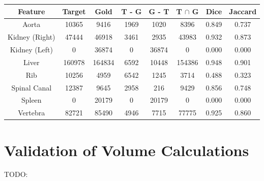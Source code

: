 \begin{center}
\begin{tabular}{cccccccc}
\scriptsize \textbf{Feature} & \scriptsize \textbf{Target} & \scriptsize \textbf{Gold} & \scriptsize \textbf{T - G} & \scriptsize \textbf{G - T} & \scriptsize \textbf{T $\cap$ G} & \scriptsize \textbf{Dice} & \scriptsize \textbf{Jaccard} \\
\hline
\scriptsize Aorta & \scriptsize 10365 & \scriptsize 9416 & \scriptsize 1969 & \scriptsize 1020 & \scriptsize 8396 & \scriptsize 0.849 & \scriptsize 0.737 \\
\scriptsize Kidney (Right) & \scriptsize 47444 & \scriptsize 46918 & \scriptsize 3461 & \scriptsize 2935 & \scriptsize 43983 & \scriptsize 0.932 & \scriptsize 0.873 \\
\scriptsize Kidney (Left) & \scriptsize 0 & \scriptsize 36874 & \scriptsize 0 & \scriptsize 36874 & \scriptsize 0 & \scriptsize 0.000 & \scriptsize 0.000 \\
\scriptsize Liver & \scriptsize 160978 & \scriptsize 164834 & \scriptsize 6592 & \scriptsize 10448 & \scriptsize 154386 & \scriptsize 0.948 & \scriptsize 0.901 \\
\scriptsize Rib & \scriptsize 10256 & \scriptsize 4959 & \scriptsize 6542 & \scriptsize 1245 & \scriptsize 3714 & \scriptsize 0.488 & \scriptsize 0.323 \\
\scriptsize Spinal Canal & \scriptsize 12387 & \scriptsize 9645 & \scriptsize 2958 & \scriptsize 216 & \scriptsize 9429 & \scriptsize 0.856 & \scriptsize 0.748 \\
\scriptsize Spleen & \scriptsize 0 & \scriptsize 20179 & \scriptsize 0 & \scriptsize 20179 & \scriptsize 0 & \scriptsize 0.000 & \scriptsize 0.000 \\
\scriptsize Vertebra & \scriptsize 82721 & \scriptsize 85490 & \scriptsize 4946 & \scriptsize 7715 & \scriptsize 77775 & \scriptsize 0.925 & \scriptsize 0.860 \\
\end{tabular}
\end{center}

\section{Validation of Volume Calculations}

TODO: \cite{woodard86}

